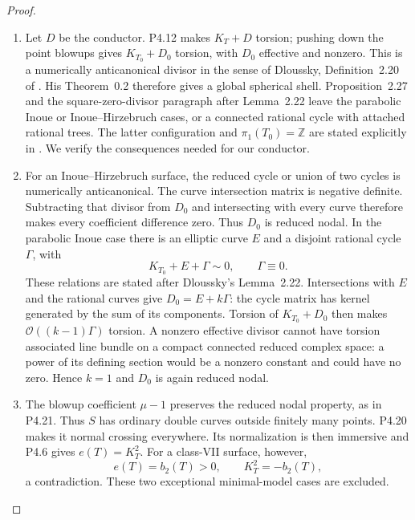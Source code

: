 \begin{proof}

\begin{enumerate}[label={$\langle1\rangle$\arabic*.},leftmargin=*]
\item Let $D$ be the conductor. P4.12 makes $K_T+D$ torsion;
pushing down the point blowups gives $K_{T_0}+D_0$ torsion,
with $D_0$ effective and nonzero. This is a numerically
anticanonical divisor in the sense of Dloussky,
Definition~2.20 of \cite{Dloussky2006}. His Theorem~0.2
therefore gives a global spherical shell. Proposition~2.27
and the square-zero-divisor paragraph after Lemma~2.22
leave the parabolic Inoue or Inoue--Hirzebruch cases,
or a connected rational cycle with attached rational
trees. The latter configuration and $\pi_1(T_0)=\mathbb Z$
are stated explicitly in \cite[\S1, pp.~284--285]{DOT2003}.
We verify the consequences needed
for our conductor.

\item For an Inoue--Hirzebruch surface, the reduced cycle or
union of two cycles is numerically anticanonical. The
curve intersection matrix is negative definite. Subtracting
that divisor from $D_0$ and intersecting with every curve
therefore makes every coefficient difference zero.
Thus $D_0$ is reduced nodal. In the parabolic Inoue case
there is an elliptic curve $E$ and a disjoint rational
cycle $\Gamma$, with
\[
 K_{T_0}+E+\Gamma\sim0,\qquad \Gamma\equiv0.
\]
These relations are stated after Dloussky's Lemma~2.22.
Intersections with $E$ and the rational curves give
$D_0=E+k\Gamma$: the cycle matrix has kernel generated
by the sum of its components. Torsion of $K_{T_0}+D_0$
then makes $\mathcal O((k-1)\Gamma)$ torsion. A nonzero
effective divisor cannot have torsion associated line
bundle on a compact connected reduced complex space:
a power of its defining section would be a nonzero
constant and could have no zero. Hence $k=1$ and
$D_0$ is again reduced nodal.

\item The blowup coefficient $\mu-1$ preserves the reduced
nodal property, as in P4.21. Thus $S$ has ordinary
double curves outside finitely many points. P4.20
makes it normal crossing everywhere. Its normalization
is then immersive and P4.6 gives $e(T)=K_T^2$.
For a class-VII surface, however,
\[
 e(T)=b_2(T)>0,\qquad K_T^2=-b_2(T),
\]
a contradiction. These two exceptional minimal-model
cases are excluded.


\end{enumerate}
\end{proof}
